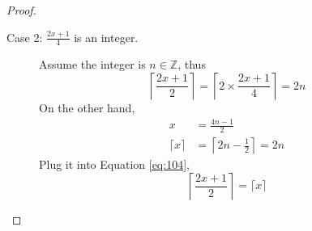 \documentclass[a4paper,12pt]{article}
\theoremstyle{definition}
\newenvironment{problems}{\begin{list}{}{\renewcommand{\makelabel}[1]{\textbf{##1}\hfil}}}{\end{list}}
\begin{document}
\begin{problems}
\begin{proof}
\begin{description}
            \item[Case 2: $\frac{2x+1}{4}$ is an integer.] Assume the integer is $n\in\mathbb{Z}$, thus
            \begin{equation}\label{eq:104}
                \left\lceil\frac{2x+1}{2}\right\rceil = \left\lceil 2\times \frac{2x+1}{4}\right\rceil = 2n
            \end{equation} 
            On the other hand, 
            \begin{align*}
                x &= \frac{4n-1}{2} \\
                \lceil x \rceil &= \left\lceil 2n-\frac{1}{2} \right\rceil= 2n 
            \end{align*}
            Plug it into Equation \eqref{eq:104},
            \begin{equation}\label{eq:105}
                \left\lceil\frac{2x+1}{2}\right\rceil = \lceil x \rceil
            \end{equation}


\end{description}
\end{proof}
\end{problems}
\end{document}
